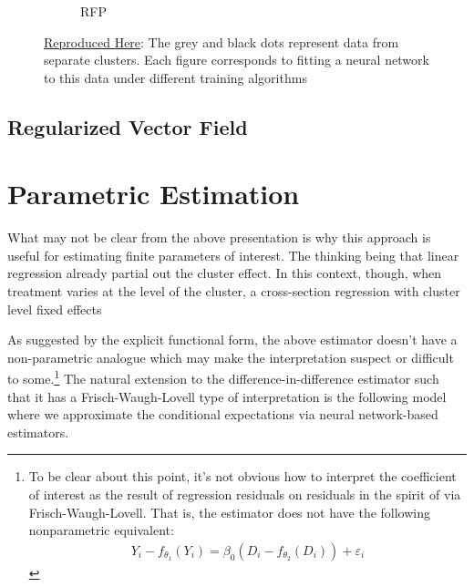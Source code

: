 \documentclass[a4paper,12pt]{article}
\begin{document}
\begin{figure}[htbp]
\begin{subfigure}{.32\textwidth}
        \caption{RFP}
    \label{fig:rfp}
\end{subfigure}
\caption{ \href{https://github.com/pharringtonp19/rfp/blob/main/notebooks/grad_desc_toy.ipynb}{Reproduced Here}: The grey and black dots represent data from separate clusters. Each figure corresponds to fitting a neural network to this data under different training algorithms}
\label{fig:mamlablation}
\end{figure}
\subsection{Regularized Vector Field}

\section{Parametric Estimation}
What may not be clear from the above presentation is why this approach is useful for estimating finite parameters of interest. The thinking being that linear regression already partial out the cluster effect. In this context, though, when treatment varies at the level of the cluster, a cross-section regression with cluster level fixed effects 

As suggested by the explicit functional form, the above estimator doesn't have a non-parametric analogue which may make the interpretation suspect or difficult to some.\footnote{To be clear about this point, it's not obvious how to interpret the coefficient of interest as the result of regression residuals on residuals in the spirit of via Frisch-Waugh-Lovell. That is, the estimator does not have the following nonparametric equivalent: 
\begin{align*}
    Y_i - f_{\theta _1}(Y_i) = \beta_0 (D_i-f_{\theta _2}(D_i)) + \varepsilon_i
\end{align*}}
The natural extension to the difference-in-difference estimator such that it has a Frisch-Waugh-Lovell type of interpretation is the following model where we approximate the conditional expectations via neural network-based estimators.
\end{document}
